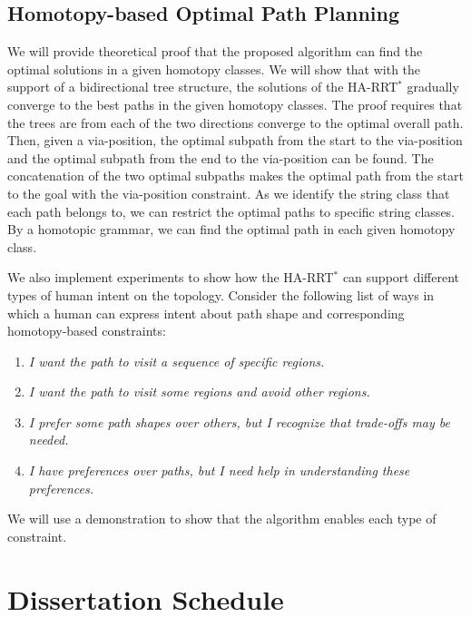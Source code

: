 \documentclass[phd]{byuprop}
\begin{document}
\subsection{Homotopy-based Optimal Path Planning}
\label{sec:validation:homotopy_based_optimal_path_planning}

We will provide theoretical proof that the proposed algorithm can find the optimal solutions in a given homotopy classes.
We will show that with the support of a bidirectional tree structure, the solutions of the HA-RRT$^{*}$ gradually converge to the best paths in the given homotopy classes.
The proof requires that the trees are from each of the two directions converge to the optimal overall path.
Then, given a via-position, the optimal subpath from the start to the via-position and the optimal subpath from the end to the via-position can be found.
The concatenation of the two optimal subpaths makes the optimal path from the start to the goal with the via-position constraint.
As we identify the string class that each path belongs to, we can restrict the optimal paths to specific string classes.
By a homotopic grammar, we can find the optimal path in each given homotopy class.

We also implement experiments to show how the HA-RRT$^{*}$ can support different types of human intent on the topology.
Consider the following list of ways in which a human can express intent about path shape and corresponding homotopy-based constraints:
\begin{enumerate}
\item \emph{I want the path to visit a sequence of specific regions.}
\item \emph{I want the path to visit some regions and avoid other regions.}
\item \emph{I prefer some path shapes over others, but I recognize that trade-offs may be needed.} 
\item \emph{I have preferences over paths, but I need help in understanding these preferences.}
\end{enumerate}
We will use a demonstration to show that the algorithm enables each type of constraint.



\section{Dissertation Schedule}
\label{sec:dissertation_schedule}
\end{document}

